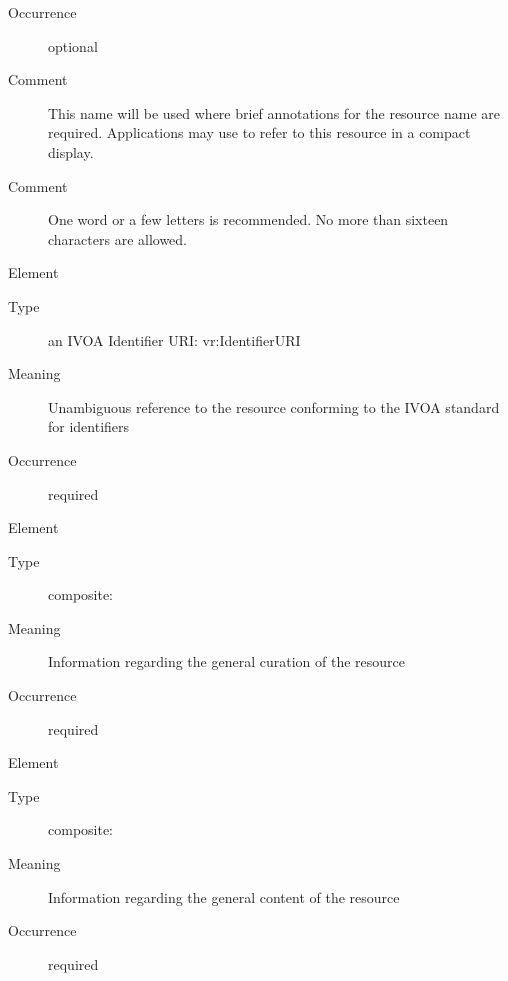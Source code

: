 \documentclass[11pt,a4paper]{ivoa}
\begin{document}
\begin{bigdescription}
\begin{description}
\item[Occurrence] optional

\item[Comment] 
                 This name will be used where brief annotations for
                 the resource name are required.  Applications may 
                 use to refer to this resource in a compact display.   
               
\item[Comment] 
                 One word or a few letters is recommended.  No more
                 than sixteen characters are allowed.
               

\end{description}
\item[Element \xmlel{identifier}]
\begin{description}
\item[Type] an IVOA Identifier URI: vr:IdentifierURI
\item[Meaning] 
                 Unambiguous reference to the resource conforming to the IVOA
                 standard for identifiers
               
\item[Occurrence] required


\end{description}
\item[Element \xmlel{curation}]
\begin{description}
\item[Type] composite: 
\item[Meaning] 
               Information regarding the general curation of the resource
             
\item[Occurrence] required

\end{description}
\item[Element \xmlel{content}]
\begin{description}
\item[Type] composite: 
\item[Meaning] 
               Information regarding the general content of the resource
             
\item[Occurrence] required

\end{description}


\end{bigdescription}\endgroup
\end{document}
